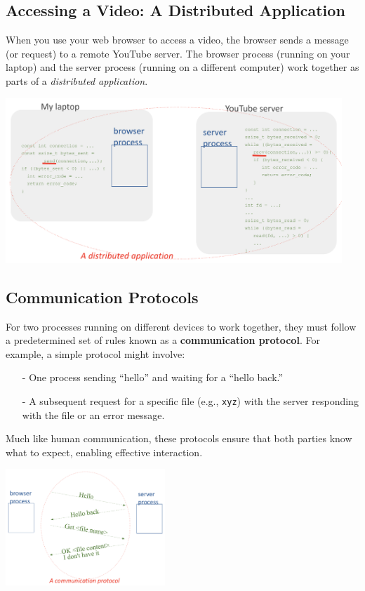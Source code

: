 \documentclass[../../compsys.tex]{subfiles}
\begin{document}
\subsection{Accessing a Video: A Distributed Application}

When you use your web browser to access a video, the browser sends a message (or request) to a remote YouTube server. The browser process (running on your laptop) and the server process (running on a different computer) work together as parts of a \emph{distributed application}. 
\begin{center}
  \includegraphics[width=0.95\textwidth]{chapters/L1/images/distributed.png}
\end{center}

\newpage
\subsection{Communication Protocols}
For two processes running on different devices to work together, they must follow a predetermined set of rules known as a \textbf{communication protocol}. For example, a simple protocol might involve:
\begin{itemize}
  \item[-] One process sending “hello” and waiting for a “hello back.”
  \item[-] A subsequent request for a specific file (e.g., \texttt{xyz}) with the server responding with the file or an error message.
\end{itemize}
Much like human communication, these protocols ensure that both parties know what to expect, enabling effective interaction.

\begin{center}
  \includegraphics[width=0.45\textwidth]{chapters/L1/images/comm_prot.png}
\end{center}
\end{document}
